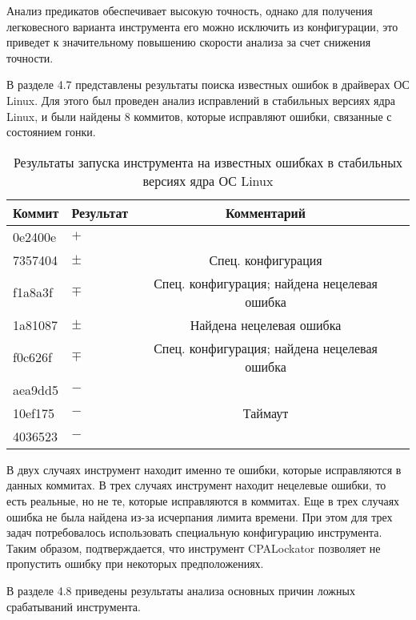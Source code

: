 Анализ предикатов обеспечивает высокую точность, однако для получения легковесного варианта инструмента его можно исключить из конфигурации, это приведет к значительному повышению скорости анализа за счет снижения точности.

В разделе 4.7 представлены результаты поиска известных ошибок в драйверах ОС Linux.
Для этого был проведен анализ исправлений в стабильных версиях ядра Linux, и были найдены 8 коммитов, которые исправляют ошибки, связанные с состоянием гонки.

  \begin{table}[h] \footnotesize \centering
    \caption{Результаты запуска инструмента на известных ошибках в стабильных версиях ядра ОС Linux}
  	\label{table-commits}
    \begin{tabular}{ | l | l | c | l |}
      \hline
      Коммит         	& Результат  & Комментарий \\ \hline
      0e2400e			& $+$   		& 	\\ 
      7357404			& $\pm$   		& 	Спец. конфигурация\\ \hline
      f1a8a3f			& $\mp$   		& Спец. конфигурация; найдена нецелевая ошибка \\ %
      1a81087			& $\pm$   		& Найдена нецелевая ошибка \\
      f0c626f			& $\mp$   		& Спец. конфигурация; найдена нецелевая ошибка \\ \hline %
      aea9dd5			& $-$   		& \\ %
      10ef175			& $-$   		& Таймаут	\\ 
      4036523			& $-$   		& \\ 
      \hline
    \end{tabular}
  \end{table}
  
В двух случаях инструмент находит именно те ошибки, которые исправляются в данных коммитах.
В трех случаях инструмент находит нецелевые ошибки, то есть реальные, но не те, которые исправляются в коммитах.
Еще в трех случаях ошибка не была найдена из-за исчерпания лимита времени.
При этом для трех задач потребовалось использовать специальную конфигурацию инструмента.
Таким образом, подтверждается, что инструмент CPALockator позволяет не пропустить ошибку при некоторых предположениях.

В разделе 4.8 приведены результаты анализа основных причин ложных срабатываний инструмента.

